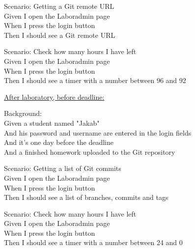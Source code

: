 Scenario: Getting a Git remote URL\\ \hspace*{1cm}
Given I open the Laboradmin page\\ \hspace*{1cm}
When I press the login button\\ \hspace*{1cm}
Then I should see a Git remote URL

Scenario: Check how many hours I have left\\ \hspace*{1cm}
Given I open the Laboradmin page\\ \hspace*{1cm}
When I press the login button\\ \hspace*{1cm}
Then I should see a timer with a number between 96 and 92\pagebreak



\underline{After laboratory, before deadline:}

Background:\\ \hspace*{1cm}
Given a student named "Jakab"\\ \hspace*{1cm}
And his password and username are entered in the login fields\\ \hspace*{1cm}
And it's one day before the deadline\\ \hspace*{1cm}
And a finished homework uploaded to the Git repository

Scenario: Getting a list of Git commits\\ \hspace*{1cm}
Given I open the Laboradmin page\\ \hspace*{1cm}
When I press the login button\\ \hspace*{1cm}
Then I should see a list of branches, commits and tags

Scenario: Check how many hours I have left\\ \hspace*{1cm}
Given I open the Laboradmin page\\ \hspace*{1cm}
When I press the login button\\ \hspace*{1cm}
Then I should see a timer with a number between 24 and 0


